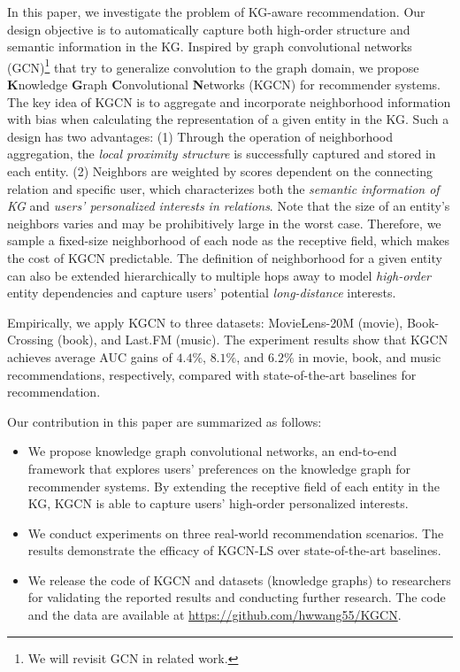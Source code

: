 \documentclass[sigconf]{acmart}
\begin{document}
	In this paper, we investigate the problem of KG-aware recommendation.
	Our design objective is to automatically capture both high-order structure and semantic information in the KG.	Inspired by graph convolutional networks (GCN)\footnote{We will revisit GCN in related work.} that try to generalize convolution to the graph domain, we propose \textbf{K}nowledge \textbf{G}raph \textbf{C}onvolutional \textbf{N}etworks (KGCN) for recommender systems.
	The key idea of KGCN is to aggregate and incorporate neighborhood information with bias when calculating the representation of a given entity in the KG.
	Such a design has two advantages:
	(1) Through the operation of neighborhood aggregation, the \textit{local proximity structure} is successfully captured and stored in each entity.
	(2) Neighbors are weighted by scores dependent on the connecting relation and specific user, which characterizes both the \textit{semantic information of KG} and \textit{users' personalized interests in relations}.
	Note that the size of an entity's neighbors varies and may be prohibitively large in the worst case.
	Therefore, we sample a fixed-size neighborhood of each node as the receptive field, which makes the cost of KGCN predictable.
The definition of neighborhood for a given entity can also be extended hierarchically to multiple hops away to model \textit{high-order} entity dependencies and capture users' potential \textit{long-distance} interests.
	
	Empirically, we apply KGCN to three datasets: MovieLens-20M (movie), Book-Crossing (book), and Last.FM (music).
	The experiment results show that KGCN achieves average AUC gains of $4.4\%$, $8.1\%$, and $6.2\%$ in movie, book, and music recommendations, respectively, compared with state-of-the-art baselines for recommendation.
	
	Our contribution in this paper are summarized as follows:
	\begin{itemize}
		\item We propose knowledge graph convolutional networks, an end-to-end framework that explores users' preferences on the knowledge graph for recommender systems. By extending the receptive field of each entity in the KG, KGCN is able to capture users' high-order personalized interests.
		\item We conduct experiments on three real-world recommendation scenarios. The results demonstrate the efficacy of KGCN-LS over state-of-the-art baselines.
		\item We release the code of KGCN and datasets (knowledge graphs) to researchers for validating the reported results and conducting further research. The code and the data are available at \url{https://github.com/hwwang55/KGCN}.
	\end{itemize}
\end{document}
